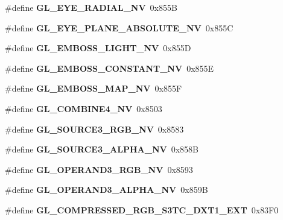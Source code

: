 \begin{DoxyCompactItemize}
\item 
\#define {\bfseries G\+L\+\_\+\+E\+Y\+E\+\_\+\+R\+A\+D\+I\+A\+L\+\_\+\+N\+V}~0x855\+B\label{_s_d_l__opengl_8h_ae1245e40b905b669041d64099397dbf8}

\item 
\#define {\bfseries G\+L\+\_\+\+E\+Y\+E\+\_\+\+P\+L\+A\+N\+E\+\_\+\+A\+B\+S\+O\+L\+U\+T\+E\+\_\+\+N\+V}~0x855\+C\label{_s_d_l__opengl_8h_a300d9fc4afa246ce40cad073967f3cc1}

\item 
\#define {\bfseries G\+L\+\_\+\+E\+M\+B\+O\+S\+S\+\_\+\+L\+I\+G\+H\+T\+\_\+\+N\+V}~0x855\+D\label{_s_d_l__opengl_8h_a9743a3182ce8de77d10238cbe33a96a1}

\item 
\#define {\bfseries G\+L\+\_\+\+E\+M\+B\+O\+S\+S\+\_\+\+C\+O\+N\+S\+T\+A\+N\+T\+\_\+\+N\+V}~0x855\+E\label{_s_d_l__opengl_8h_aa90eb3af667185519e3459b19a0b46bf}

\item 
\#define {\bfseries G\+L\+\_\+\+E\+M\+B\+O\+S\+S\+\_\+\+M\+A\+P\+\_\+\+N\+V}~0x855\+F\label{_s_d_l__opengl_8h_af62bba70e9f898b7753ce6b1fd6bf6f4}

\item 
\#define {\bfseries G\+L\+\_\+\+C\+O\+M\+B\+I\+N\+E4\+\_\+\+N\+V}~0x8503\label{_s_d_l__opengl_8h_adfaf3a53223044e9aa16518406395483}

\item 
\#define {\bfseries G\+L\+\_\+\+S\+O\+U\+R\+C\+E3\+\_\+\+R\+G\+B\+\_\+\+N\+V}~0x8583\label{_s_d_l__opengl_8h_adcc513d810406b65209ce77edd661613}

\item 
\#define {\bfseries G\+L\+\_\+\+S\+O\+U\+R\+C\+E3\+\_\+\+A\+L\+P\+H\+A\+\_\+\+N\+V}~0x858\+B\label{_s_d_l__opengl_8h_ac0fb9d35219196abb26f406480944817}

\item 
\#define {\bfseries G\+L\+\_\+\+O\+P\+E\+R\+A\+N\+D3\+\_\+\+R\+G\+B\+\_\+\+N\+V}~0x8593\label{_s_d_l__opengl_8h_abb4caf86bf032ebbff38a560f45112d0}

\item 
\#define {\bfseries G\+L\+\_\+\+O\+P\+E\+R\+A\+N\+D3\+\_\+\+A\+L\+P\+H\+A\+\_\+\+N\+V}~0x859\+B\label{_s_d_l__opengl_8h_a052d824f437843d0633da401803121d6}

\item 
\#define {\bfseries G\+L\+\_\+\+C\+O\+M\+P\+R\+E\+S\+S\+E\+D\+\_\+\+R\+G\+B\+\_\+\+S3\+T\+C\+\_\+\+D\+X\+T1\+\_\+\+E\+X\+T}~0x83\+F0\label{_s_d_l__opengl_8h_a76871dbc9ac35424b25ebc707ca11390}


\end{DoxyCompactItemize}
